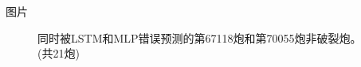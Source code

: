 \documentclass[8pt,compress,t,notheorems,noamsthm,notheorem,xcolor=x11names]{beamer}
\theoremstyle{nonumberplain}%
\theoremstyle{plain}
\begin{document}
\begin{frame}{图片}
\begin{figure}[htbp]
	\centering
	\caption{同时被LSTM和MLP错误预测的第67118炮和第70055炮非破裂炮。(共21炮)}
	\label{fig9}
\end{figure}
\end{frame}
\end{document}
